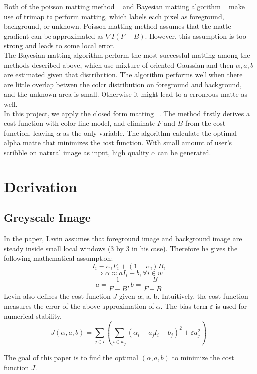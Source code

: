 \documentclass[11pt,letterpaper]{article}
\begin{document}
Both of the poisson matting method ~\cite{Sun:2004} and Bayesian matting algorithm ~\cite{Chuang:2001} make use of trimap to perform matting, which labels each pixel as foreground, background, or unknown. Poisson matting method assumes that the matte gradient can be approximated as $\nabla I (F - B)$. However, this assumption is too strong and leads to some local error. \\

The Bayesian matting algorithm perform the most successful matting among the methods described above, which use mixture of oriented Gaussian and then $\alpha, a, b$ are estimated given that distribution. The algorithm performs well when there are little overlap betwen the color distribution on foreground and background, and the unknown area is small. Otherwise it might lead to a erroneous matte as well. \\

In this project, we apply the closed form matting ~\cite{Levin:2006}. The method firstly derives a cost function with color line model, and eliminate $F$ and $B$ from the cost function, leaving $\alpha$ as the only variable. The algorithm calculate the optimal alpha matte that minimizes the cost function. With small amount of user's scribble on natural image as input, high quality $\alpha$ can be generated.

\section{Derivation}
\subsection{Greyscale Image}
In the paper, Levin assumes that foreground image and background image are steady inside small local windows (3 by 3 in his case). Therefore he gives the following mathematical assumption:
$$I_i = \alpha_i F_i + (1 - \alpha_i)B_i$$
$$\Rightarrow \alpha \approx aI_{i} + b, \forall i \in w $$
$$a = \frac{1}{F-B}, b = \frac{-B}{F-B} $$
Levin also defines the cost function $J$ given $\alpha$, a, b. Intuitively, the cost function measures the error of the above approximation of $\alpha$. The bias term $\varepsilon$ is used for numerical stability.
$$J(\alpha, a, b) = \sum_{j \in I}(\sum_{i \in w_j}(\alpha_i - a_jI_i-b_j)^2+\varepsilon a_j^2)$$

The goal of this paper is to find the optimal $(\alpha, a, b)$ to minimize the cost function $J$.\\
\end{document}
